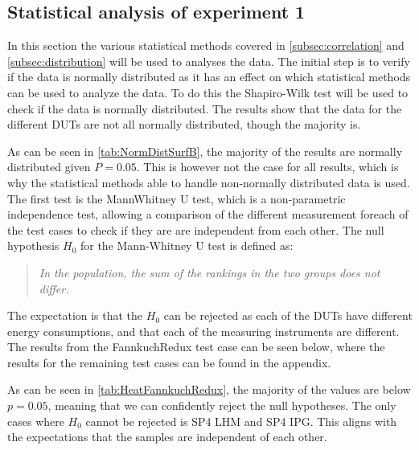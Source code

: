 \subsection{Statistical analysis of experiment 1}

In this section the various statistical methods covered in \cref{subsec:correlation} and \cref{subsec:distribution} will be used to analyses the data. The initial step is to verify if the data is normally distributed as it has an effect on which statistical methods can be used to analyze the data. To do this the Shapiro-Wilk test will be used to check if the data is normally distributed. The results show that the data for the different DUTs are not all normally distributed, though the majority is.



As can be seen in \cref{tab:NormDistSurfB}, the majority of the results are normally distributed given $P = 0.05$. This is however not the case for all results, which is why the statistical methods able to handle non-normally distributed data is used. The first test is the MannWhitney U test, which is a non-parametric independence test, allowing a comparison of the different measurement foreach of the test cases to check if they are are independent from each other. The null hypothesis $H_0$ for the Mann-Whitney U test is defined as:

\begin{quote}
    \textit{In the population, the sum of the rankings in the two groups does not differ.}
\end{quote}

The expectation is that the $H_0$ can be rejected as each of the DUTs have different energy consumptions, and that each of the measuring instruments are different.
The results from the FannkuchRedux test case can be seen below, where the results for the remaining test cases can be found in the appendix.
 

As can be seen in \cref{tab:HeatFannkuchRedux}, the majority of the values are below $p = 0.05$, meaning that we can confidently reject the null hypotheses. The only cases where $H_0$ cannot be rejected is SP4 LHM and SP4 IPG. This aligns with the expectations that the samples are independent of each other.

